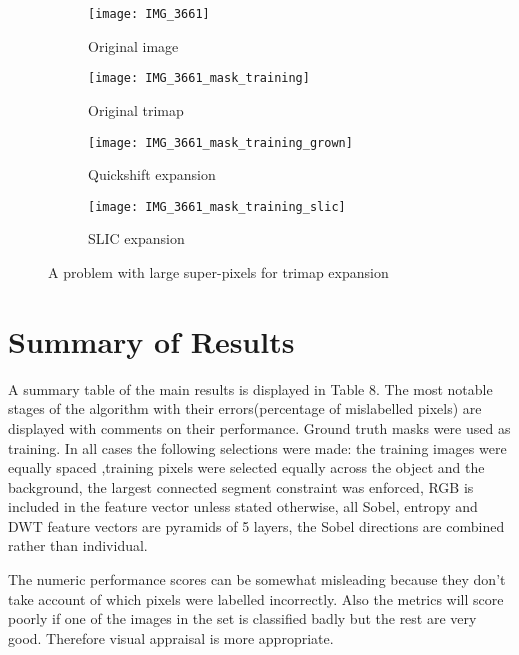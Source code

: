 \documentclass[12pt]{IIBproject}
\begin{document}
\begin{figure}[H]
\centering
\begin{subfigure}{.45\textwidth}
  \centering
  \texttt{[image: IMG\_3661]}
  \caption{Original image}
  \label{fig:sub2}
\end{subfigure}
\begin{subfigure}{.45\textwidth}
  \centering
  \texttt{[image: IMG\_3661\_mask\_training]}
  \caption{Original trimap}
  \label{fig:sub2}
\end{subfigure}
\begin{subfigure}{.45\textwidth}
  \centering
  \texttt{[image: IMG\_3661\_mask\_training\_grown]}
  \caption{Quickshift expansion}
  \label{fig:sub2}
\end{subfigure}
\begin{subfigure}{.45\textwidth}
  \centering
  \texttt{[image: IMG\_3661\_mask\_training\_slic]}
  \caption{SLIC expansion}
  \label{fig:sub2}
\end{subfigure}



\caption{A problem with large super-pixels for trimap expansion}
\label{fig:test}
\end{figure}









\section{Summary of Results}
A summary table of the main results is displayed in Table 8. The most notable stages of the algorithm with their errors(percentage of mislabelled pixels) are displayed with comments on their performance. Ground truth masks were used as training. In all cases the following selections were made: the training images were equally spaced ,training pixels were selected equally across the object and the background, the largest connected segment constraint was enforced, RGB is included in the feature vector unless stated otherwise, all Sobel, entropy and DWT feature vectors are pyramids of 5 layers, the Sobel directions are combined rather than individual.

The numeric performance scores can be somewhat misleading because they don't take account of which pixels were labelled incorrectly. Also the metrics will score poorly if one of the images in the set is classified badly but the rest are very good. Therefore visual appraisal is more appropriate.
\end{document}

